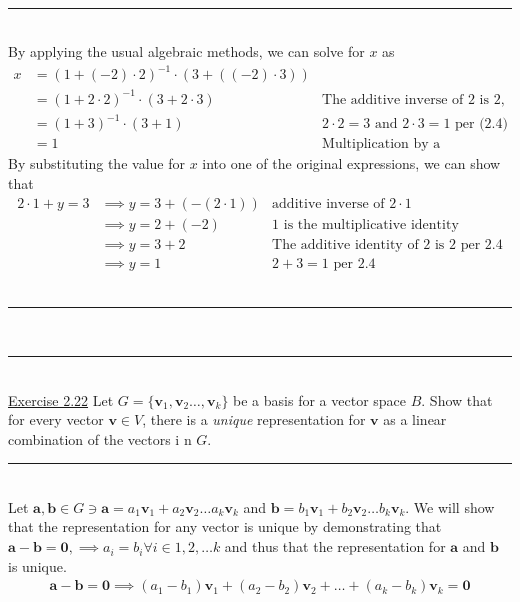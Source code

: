 \documentclass{article}
\newcommand{\problemsep}{\leavevmode\\[0.05in] \rule[\baselineskip/4]{\textwidth}{1pt} \\[0.005in] \rule[\baselineskip]{\textwidth}{1pt}\vspace{-\baselineskip}\leavevmode\\[0.05in]}
\newcommand{\statementsep}{\leavevmode\\[0.005in] \rule[\baselineskip/4]{\textwidth}{0.4pt}\leavevmode\\[0.005in]}
\begin{document}
\statementsep
By applying the usual algebraic methods, we can solve for $x$ as 
\begin{equation*}\begin{aligned}
	x & = (1 + (-2)\cdot 2)^{-1}\cdot (3 + ((-2)\cdot 3))	& \\
		& = (1 + 2\cdot 2)^{-1}\cdot (3 + 2\cdot 3)         & \text{The additive inverse of 2 is 2, per (2.4)}\\
		& = (1 + 3)^{-1}\cdot (3 + 1)                       & \text{$2\cdot 2 = 3$ and $2\cdot 3 = 1$ per (2.4)} \\
		& = 1                                               & \text{Multiplication by a multiplicative inverse is 1}
\end{aligned}\end{equation*}
By substituting the value for $x$ into one of the original expressions, we can show that
\begin{equation*}\begin{aligned}
	2\cdot 1 + y = 3 & \implies y = 3 + (-(2\cdot 1)) & \text{additive inverse of $2\cdot 1$} \\
                   & \implies y = 2 + (-2)          & \text{$1$ is the multiplicative identity} \\ 
                   & \implies y = 3 + 2             & \text{The additive identity of 2 is 2 per 2.4} \\
                   & \implies y = 1                 & \text{$2 + 3 = 1$ per 2.4}
\end{aligned}\end{equation*}
\problemsep
\noindent\underline{Exercise 2.22}
Let $G = \{\mathbf{v}_1, \mathbf{v}_2 \hdots, \mathbf{v}_k \}$ be a basis for a vector space $B$. Show that for every vector $\mathbf{v} \in V$, there is a {\it unique} representation for $\mathbf{v}$ as a linear combination of the vectors i n $G$.
\statementsep
Let $\mathbf{a}, \mathbf{b} \in G \ni \mathbf{a} = a_1\mathbf{v}_1 + a_2\mathbf{v}_2 \hdots a_k\mathbf{v}_k$ and $\mathbf{b} = b_1\mathbf{v}_1 + b_2\mathbf{v}_2 \hdots b_k \mathbf{v}_k$. We will show that the representation for any vector is unique by demonstrating that $\mathbf{a} - \mathbf{b} = \mathbf{0}, \implies a_i = b_i \forall i \in {1,2,\hdots k}$ and thus that the representation for $\mathbf{a}$ and $\mathbf{b}$ is unique. 
	\begin{equation*}\begin{aligned}
		\mathbf{a} - \mathbf{b} = \mathbf{0} \implies (a_1 - b_1)\mathbf{v}_1 + (a_2 - b_2)\mathbf{v}_2 + \hdots + (a_k - b_k)\mathbf{v}_k = \mathbf{0}
	\end{aligned}\end{equation*}
\end{document}
